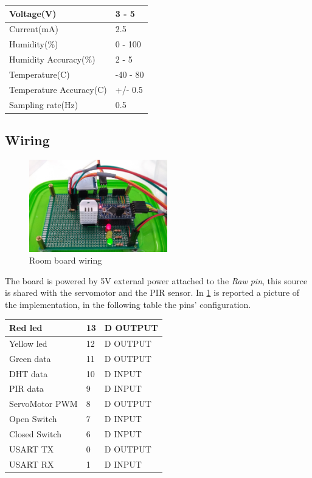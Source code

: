 \begin{center}
	\begin{tabular}{||l | l||} 
		\hline
		Voltage(V) & 3 - 5 \\ 
		\hline
		Current(mA) & 2.5 \\
		\hline
		Humidity(\%) & 0 - 100 \\
		\hline
		Humidity Accuracy(\%) & 2 - 5 \\
		\hline
		Temperature(C\degree) & -40 - 80 \\
		\hline
		Temperature Accuracy(C\degree) & +/- 0.5 \\
		\hline
		Sampling rate(Hz) & 0.5 \\
		\hline
	\end{tabular}
\end{center}


\subsection{Wiring}
	\begin{figure}[h]
		\centering
		\includegraphics[width=6cm,keepaspectratio]{img/room_board_wiring}
		\caption{Room board wiring}
		\label{fig:room_wiring}
	\end{figure}
	The board is powered by 5V external power attached to the \textit{Raw pin}, this source is shared with the servomotor and the PIR sensor.
	In \ref{fig:room_wiring} is reported a picture of the implementation, in the following table the pins' configuration.
	\begin{center}
		\begin{tabular}{||l | l | l ||} 
			\hline
			Red led 			& 13 & D OUTPUT\\ 
			\hline
			Yellow led 			& 12 & D OUTPUT\\
			\hline
			Green data 			& 11 & D OUTPUT\\ 
			\hline
			DHT data 			& 10 & D INPUT\\ 
			\hline
			PIR data 			& 9 & D INPUT\\ 
			\hline
			ServoMotor PWM 		& 8 & D OUTPUT\\ 
			\hline
			Open Switch 		& 7 & D INPUT\\ 
			\hline
			Closed Switch 		& 6 & D INPUT\\ 
			\hline
			USART TX	 		& 0 & D OUTPUT\\ 
			\hline
			USART RX 			& 1 & D INPUT\\ 
			\hline
		\end{tabular}
	\end{center}
	